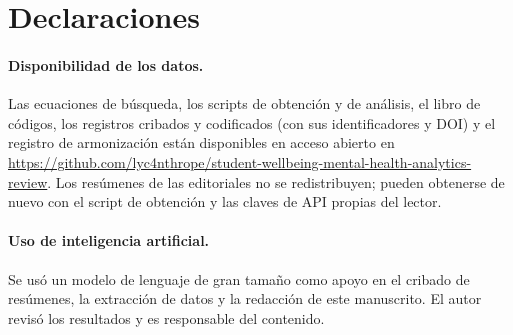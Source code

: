 \documentclass[11pt,a4paper]{article}
\begin{document}
\section*{Declaraciones}

\paragraph{Disponibilidad de los datos.} Las ecuaciones de búsqueda, los scripts de obtención y de análisis, el libro de códigos, los registros cribados y codificados (con sus identificadores y DOI) y el registro de armonización están disponibles en acceso abierto en \url{https://github.com/lyc4nthrope/student-wellbeing-mental-health-analytics-review}. Los resúmenes de las editoriales no se redistribuyen; pueden obtenerse de nuevo con el script de obtención y las claves de API propias del lector.

\paragraph{Uso de inteligencia artificial.} Se usó un modelo de lenguaje de gran tamaño como apoyo en el cribado de resúmenes, la extracción de datos y la redacción de este manuscrito. El autor revisó los resultados y es responsable del contenido.



\end{document}
